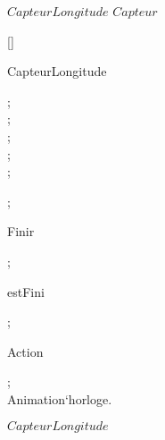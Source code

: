 \kClass $CapteurLongitude$ \kISO $Capteur$
\par
\kInstanceVarDef
\parlinebr
\begin{insvar}
[{\False }]
\end{insvar}
\par
\kOperations
{}\begin{op}[e]{CapteurLongitude}%
\signature{\Nat  \Mult Controleur`typeActeur \Mult \mapof{\Nat \Gmap \Int } \Mult Contexte \Mult \Natone  \Mult \Bool  \Oto CapteurLongitude}
\begin{blockstmt}
 ; \\
 ; \\
 ; \\
 ; \\
 ; \\
\end{blockstmt};
\end{op}
\begin{op}[e]{Finir}%
\signature{() \Oto ()}
\parms{}
;
\end{op}
\begin{op}[e]{estFini}%
\signature{() \Oto ()}
\parms{}
\Skip ;
\end{op}
\begin{op}[e]{Action}%
\signature{() \Oto ()}
\parms{}
\begin{blockstmt}
\end{blockstmt}
\end{op}
\kThreadDef
\begin{thread}
\begin{while}{\True }
\begin{blockstmt}
 ; \\
Animation`horloge.
\end{blockstmt}
\end{while}
\end{thread}
\kSync
{}
\kEnd $CapteurLongitude$

